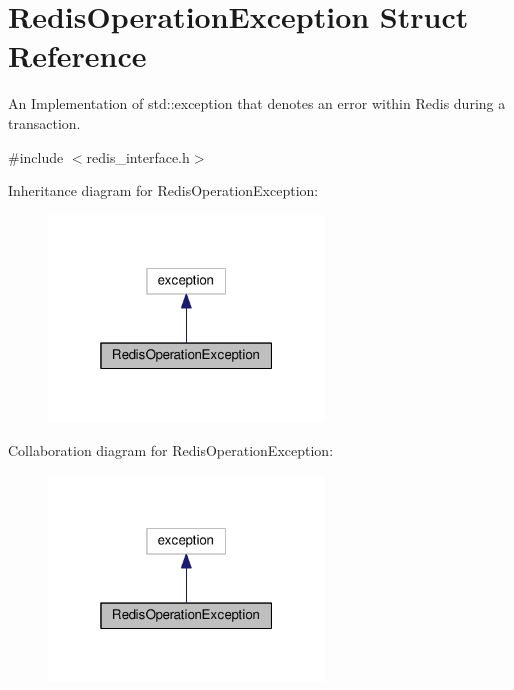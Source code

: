 \hypertarget{structRedisOperationException}{}\section{Redis\+Operation\+Exception Struct Reference}
\label{structRedisOperationException}


An Implementation of std\+::exception that denotes an error within Redis during a transaction.  




{\ttfamily \#include $<$redis\+\_\+interface.\+h$>$}



Inheritance diagram for Redis\+Operation\+Exception\+:\nopagebreak
\begin{figure}[H]
\begin{center}
\leavevmode
\includegraphics[width=208pt]{structRedisOperationException__inherit__graph}
\end{center}
\end{figure}


Collaboration diagram for Redis\+Operation\+Exception\+:\nopagebreak
\begin{figure}[H]
\begin{center}
\leavevmode
\includegraphics[width=208pt]{structRedisOperationException__coll__graph}
\end{center}
\end{figure}
